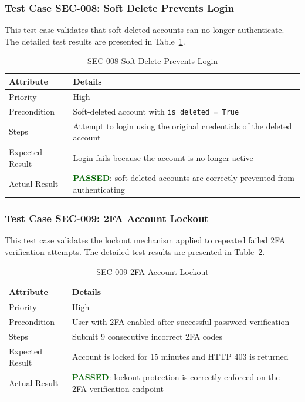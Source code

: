 \subsubsection{Test Case SEC-008: Soft Delete Prevents Login}

This test case validates that soft-deleted accounts can no longer authenticate. The detailed test results are presented in Table~\ref{tab:sec008}.

\begin{table}[H]
\centering
\caption{SEC-008 Soft Delete Prevents Login}
\label{tab:sec008}
\renewcommand{\arraystretch}{1.3}

\begin{tabular}{|p{2cm}|p{13cm}|}
\hline
\rowcolor{red!10}
\textbf{Attribute} & \textbf{Details} \\
\hline
Priority & High \\
\hline
Precondition & Soft-deleted account with \texttt{is\_deleted = True} \\
\hline
Steps & Attempt to login using the original credentials of the deleted account \\
\hline
Expected Result & Login fails because the account is no longer active \\
\hline
Actual Result & \textbf{\textcolor{darkgreen}{PASSED}}: soft-deleted accounts are correctly prevented from authenticating \\
\hline
\end{tabular}
\end{table}

\subsubsection{Test Case SEC-009: 2FA Account Lockout}

This test case validates the lockout mechanism applied to repeated failed 2FA verification attempts. The detailed test results are presented in Table~\ref{tab:sec009}.

\begin{table}[H]
\centering
\caption{SEC-009 2FA Account Lockout}
\label{tab:sec009}
\renewcommand{\arraystretch}{1.3}

\begin{tabular}{|p{2cm}|p{13cm}|}
\hline
\rowcolor{red!10}
\textbf{Attribute} & \textbf{Details} \\
\hline
Priority & High \\
\hline
Precondition & User with 2FA enabled after successful password verification \\
\hline
Steps & Submit 9 consecutive incorrect 2FA codes \\
\hline
Expected Result & Account is locked for 15 minutes and HTTP 403 is returned \\
\hline
Actual Result & \textbf{\textcolor{darkgreen}{PASSED}}: lockout protection is correctly enforced on the 2FA verification endpoint \\
\hline
\end{tabular}
\end{table}
